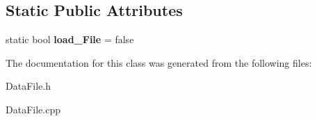 \subsection*{Static Public Attributes}
\begin{DoxyCompactItemize}
\item 
static bool {\bfseries load\+\_\+\+File} = false\hypertarget{classdataFile_a6c1de5dd9edd96daae7d91da9f56f075}{}\label{classdataFile_a6c1de5dd9edd96daae7d91da9f56f075}

\end{DoxyCompactItemize}


The documentation for this class was generated from the following files\+:\begin{DoxyCompactItemize}
\item 
Data\+File.\+h\item 
Data\+File.\+cpp\end{DoxyCompactItemize}
